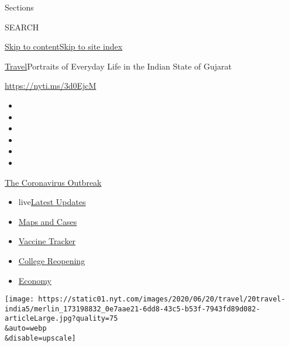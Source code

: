 Sections

SEARCH

\protect\hyperlink{site-content}{Skip to
content}\protect\hyperlink{site-index}{Skip to site index}

\href{/section/travel}{Travel}\textbar{}Portraits of Everyday Life in
the Indian State of Gujarat

\url{https://nyti.ms/3d0EjcM}

\begin{itemize}
\item
\item
\item
\item
\item
\item
\end{itemize}

\href{https://www.nytimes.com/news-event/coronavirus?action=click\&pgtype=Article\&state=default\&region=TOP_BANNER\&context=storylines_menu}{The
Coronavirus Outbreak}

\begin{itemize}
\tightlist
\item
  live\href{https://www.nytimes.com/2020/08/04/world/coronavirus-covid-19.html?action=click\&pgtype=Article\&state=default\&region=TOP_BANNER\&context=storylines_menu}{Latest
  Updates}
\item
  \href{https://www.nytimes.com/interactive/2020/us/coronavirus-us-cases.html?action=click\&pgtype=Article\&state=default\&region=TOP_BANNER\&context=storylines_menu}{Maps
  and Cases}
\item
  \href{https://www.nytimes.com/interactive/2020/science/coronavirus-vaccine-tracker.html?action=click\&pgtype=Article\&state=default\&region=TOP_BANNER\&context=storylines_menu}{Vaccine
  Tracker}
\item
  \href{https://www.nytimes.com/2020/08/02/us/covid-college-reopening.html?action=click\&pgtype=Article\&state=default\&region=TOP_BANNER\&context=storylines_menu}{College
  Reopening}
\item
  \href{https://www.nytimes.com/live/2020/08/03/business/stock-market-today-coronavirus?action=click\&pgtype=Article\&state=default\&region=TOP_BANNER\&context=storylines_menu}{Economy}
\end{itemize}

\texttt{[image: https://static01.nyt.com/images/2020/06/20/travel/20travel-india5/merlin\_173198832\_0e7aae21-6dd8-43c5-b53f-7943fd89d082-articleLarge.jpg?quality=75\\\&auto=webp\\\&disable=upscale]}

